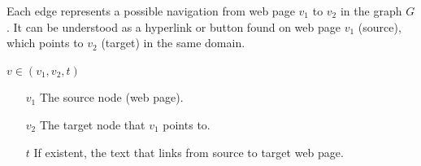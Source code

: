 Each edge represents a possible navigation from web page $v_1$ to $v_2$ in the graph $G$. It can be understood as a hyperlink or button found on web page $v_1$ (source), which points to $v_2$ (target) in the same domain. 

\begin{center}
	$v \in (v_1, v_2, t)$
	\begin{itemize}
		\item[$v_1$] The source node (web page).
		\item[$v_2$] The target node that $v_1$ points to.
		\item[$t$] If existent, the text that links from source to target web page.
	\end{itemize}
\end{center}

\begin{figure}
\centering
\usetikzlibrary{shapes.multipart}
\end{figure}
